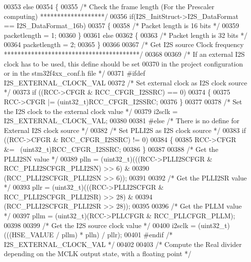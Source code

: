 \begin{DoxyCode}
00353   \textcolor{keywordflow}{else}
00354   \{
00355     \textcolor{comment}{/* Check the frame length (For the Prescaler computing) *******************/}
00356     \textcolor{keywordflow}{if}(I2S\_InitStruct->I2S_DataFormat == I2S_DataFormat_16b)
00357     \{
00358       \textcolor{comment}{/* Packet length is 16 bits */}
00359       packetlength = 1;
00360     \}
00361     \textcolor{keywordflow}{else}
00362     \{
00363       \textcolor{comment}{/* Packet length is 32 bits */}
00364       packetlength = 2;
00365     \}
00366 
00367     \textcolor{comment}{/* Get I2S source Clock frequency  ****************************************/}
00368 
00369     \textcolor{comment}{/* If an external I2S clock has to be used, this define should be set  }
00370 \textcolor{comment}{       in the project configuration or in the stm32f4xx\_conf.h file */}
00371   \textcolor{preprocessor}{#}\textcolor{preprocessor}{ifdef} \textcolor{preprocessor}{I2S\_EXTERNAL\_CLOCK\_VAL}
00372     \textcolor{comment}{/* Set external clock as I2S clock source */}
00373     \textcolor{keywordflow}{if} ((RCC->CFGR & RCC\_CFGR\_I2SSRC) == 0)
00374     \{
00375       RCC->CFGR |= (uint32\_t)RCC\_CFGR\_I2SSRC;
00376     \}
00377 
00378     \textcolor{comment}{/* Set the I2S clock to the external clock  value */}
00379     i2sclk = I2S\_EXTERNAL\_CLOCK\_VAL;
00380 
00381   \textcolor{preprocessor}{#}\textcolor{preprocessor}{else} \textcolor{comment}{/* There is no define for External I2S clock source */}
00382     \textcolor{comment}{/* Set PLLI2S as I2S clock source */}
00383     \textcolor{keywordflow}{if} ((RCC->CFGR & RCC_CFGR_I2SSRC) != 0)
00384     \{
00385       RCC->CFGR &= ~(uint32\_t)RCC_CFGR_I2SSRC;
00386     \}
00387 
00388     \textcolor{comment}{/* Get the PLLI2SN value */}
00389     plln = (uint32\_t)(((RCC->PLLI2SCFGR & RCC_PLLI2SCFGR_PLLI2SN) >> 6) &
00390                       (RCC_PLLI2SCFGR_PLLI2SN >> 6));
00391 
00392     \textcolor{comment}{/* Get the PLLI2SR value */}
00393     pllr = (uint32\_t)(((RCC->PLLI2SCFGR & RCC_PLLI2SCFGR_PLLI2SR) >> 28) &
00394                       (RCC_PLLI2SCFGR_PLLI2SR >> 28));
00395 
00396     \textcolor{comment}{/* Get the PLLM value */}
00397     pllm = (uint32\_t)(RCC->PLLCFGR & RCC_PLLCFGR_PLLM);
00398 
00399     \textcolor{comment}{/* Get the I2S source clock value */}
00400     i2sclk = (uint32\_t)(((HSE_VALUE / pllm) * plln) / pllr);
00401   \textcolor{preprocessor}{#}\textcolor{preprocessor}{endif} \textcolor{comment}{/* I2S\_EXTERNAL\_CLOCK\_VAL */}
00402 
00403     \textcolor{comment}{/* Compute the Real divider depending on the MCLK output state, with a floating point */}

\end{DoxyCode}
